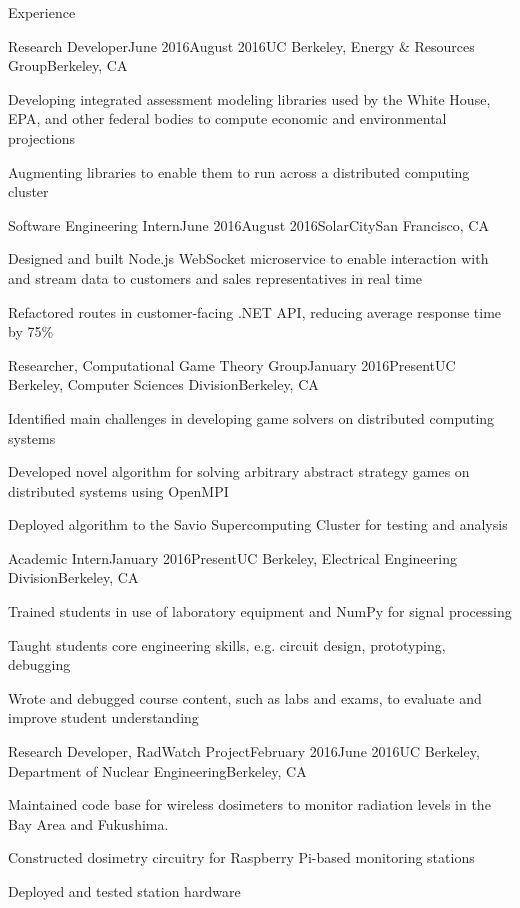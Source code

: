 \documentclass{resume} %
\begin{document}
\begin{rSection}{Experience}
\begin{rSubsection}{Research Developer}{June 2016\textminus August 2016}{UC Berkeley, Energy \& Resources Group}{Berkeley, CA}
\item[] Developing integrated assessment modeling libraries used by the White House, EPA, and other federal bodies to compute economic and environmental projections 
\item[] Augmenting libraries to enable them to run across a distributed computing cluster
\end{rSubsection}
\begin{rSubsection}{Software Engineering Intern}{June 2016\textminus August 2016}{SolarCity}{San Francisco, CA}
\item[] Designed and built Node.js WebSocket microservice to enable interaction with and stream data to customers and sales representatives in real time
\item[] Refactored routes in customer-facing .NET API, reducing average response time by 75\%
\end{rSubsection}
\begin{rSubsection}{Researcher, Computational Game Theory Group}{January 2016\textminus Present}{UC Berkeley, Computer Sciences Division}{Berkeley, CA}
\item[] Identified main challenges in developing game solvers on distributed computing systems
\item[] Developed novel algorithm for solving arbitrary abstract strategy games on distributed systems using OpenMPI
\item[] Deployed algorithm to the Savio Supercomputing Cluster for testing and analysis
\end{rSubsection}
\begin{rSubsection}{Academic Intern}{January 2016\textminus Present}{UC Berkeley, Electrical Engineering Division}{Berkeley, CA}
\item[] Trained students in use of laboratory equipment and NumPy for signal processing
\item[] Taught students core engineering skills, e.g. circuit design, prototyping, debugging
\item[] Wrote and debugged course content, such as labs and exams, to evaluate and improve student understanding
\end{rSubsection}
\begin{rSubsection}{Research Developer, RadWatch Project}{February 2016\textminus June 2016}{UC Berkeley, Department of Nuclear Engineering}{Berkeley, CA}
\item[] Maintained code base for wireless dosimeters to monitor radiation levels in the Bay Area and Fukushima.
\item[] Constructed dosimetry circuitry for Raspberry Pi-based monitoring stations
\item[] Deployed and tested station hardware
\end{rSubsection}
\end{rSection}
\end{document}
